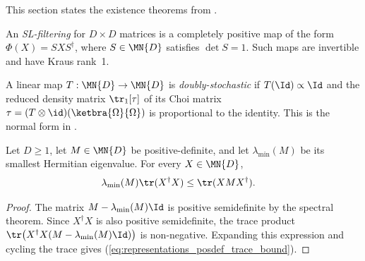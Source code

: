 This section states the existence theorems from
\cite[Section~2.4]{Wolf2012Quantum}.

\begin{definition}\label{def:sl_filtering}
    \leanok
    An \emph{SL-filtering} for $D \times D$ matrices is a completely
    positive map of the form $\Phi(X)=SXS^{\dagger}$, where
    $S \in \MN{D}$ satisfies $\det S=1$. Such maps are
    invertible and have Kraus rank~1.
\end{definition}

\begin{definition}\label{def:doubly_stochastic}
    \leanok
    A linear map $T : \MN{D} \to \MN{D}$ is \emph{doubly-stochastic}
    if $T(\Id)\propto\Id$ and the reduced density matrix
    $\tr_{1}[\tau]$ of its Choi matrix
    $\tau=(T\otimes\id)(\ketbra{\Omega}{\Omega})$
    is proportional to the identity. This is the normal form in
    \cite[Proposition~2.9]{Wolf2012Quantum}.
\end{definition}

\begin{lemma}\label{lem:posdef_trace_lower_bound}
    \leanok
    Let $D\geq1$, let $M\in\MN{D}$ be positive-definite, and let
    $\lambda_{\min}(M)$ be its smallest Hermitian eigenvalue. For every
    $X\in\MN{D}$,
    \begin{align}
        \lambda_{\min}(M)\tr(X^{\dagger}X)
        &\leq \tr(XMX^{\dagger}).
        \label{eq:representations_posdef_trace_bound}
    \end{align}
\end{lemma}

\begin{proof}
    \leanok
    The matrix $M-\lambda_{\min}(M)\Id$ is positive semidefinite by the
    spectral theorem. Since $X^{\dagger}X$ is also positive semidefinite, the
    trace product
    $\tr\!\left(X^{\dagger}X(M-\lambda_{\min}(M)\Id)\right)$
    is non-negative. Expanding this expression and cycling the trace gives
    (\ref{eq:representations_posdef_trace_bound}).
\end{proof}

